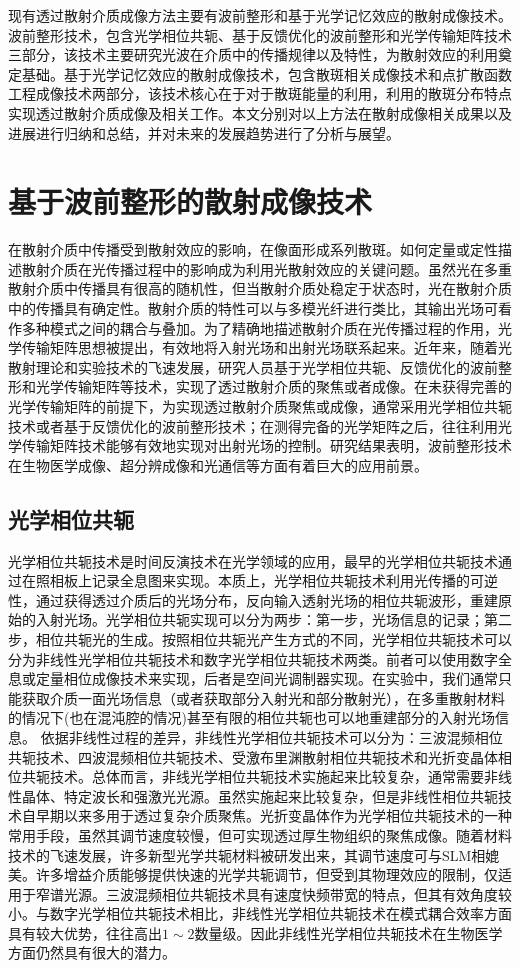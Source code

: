 现有透过散射介质成像方法主要有波前整形和基于光学记忆效应的散射成像技术。波前整形技术，包含光学相位共轭、基于反馈优化的波前整形和光学传输矩阵技术三部分，该技术主要研究光波在介质中的传播规律以及特性，为散射效应的利用奠定基础。基于光学记忆效应的散射成像技术，包含散斑相关成像技术和点扩散函数工程成像技术两部分，该技术核心在于对于散斑能量的利用，利用的散斑分布特点实现透过散射介质成像及相关工作。本文分别对以上方法在散射成像相关成果以及进展进行归纳和总结，并对未来的发展趋势进行了分析与展望。

\section{基于波前整形的散射成像技术}

在散射介质中传播受到散射效应的影响，在像面形成系列散斑。如何定量或定性描述散射介质在光传播过程中的影响成为利用光散射效应的关键问题。虽然光在多重散射介质中传播具有很高的随机性，但当散射介质处稳定于状态时，光在散射介质中的传播具有确定性。散射介质的特性可以与多模光纤进行类比，其输出光场可看作多种模式之间的耦合与叠加。为了精确地描述散射介质在光传播过程的作用，光学传输矩阵思想被提出，有效地将入射光场和出射光场联系起来。近年来，随着光散射理论和实验技术的飞速发展，研究人员基于光学相位共轭、反馈优化的波前整形和光学传输矩阵等技术，实现了透过散射介质的聚焦或者成像。在未获得完善的光学传输矩阵的前提下，为实现透过散射介质聚焦或成像，通常采用光学相位共轭技术或者基于反馈优化的波前整形技术；在测得完备的光学矩阵之后，往往利用光学传输矩阵技术能够有效地实现对出射光场的控制。研究结果表明，波前整形技术在生物医学成像、超分辨成像和光通信等方面有着巨大的应用前景。

\subsection{光学相位共轭}

光学相位共轭技术是时间反演技术在光学领域的应用，最早的光学相位共轭技术通过在照相板上记录全息图来实现。本质上，光学相位共轭技术利用光传播的可逆性，通过获得透过介质后的光场分布，反向输入透射光场的相位共轭波形，重建原始的入射光场。光学相位共轭实现可以分为两步：第一步，光场信息的记录；第二步，相位共轭光的生成。按照相位共轭光产生方式的不同，光学相位共轭技术可以分为非线性光学相位共轭技术和数字光学相位共轭技术两类。前者可以使用数字全息或定量相位成像技术来实现，后者是空间光调制器实现。在实验中，我们通常只能获取介质一面光场信息（或者获取部分入射光和部分散射光），在多重散射材料的情况下(也在混沌腔的情况)甚至有限的相位共轭也可以地重建部分的入射光场信息。
依据非线性过程的差异，非线性光学相位共轭技术可以分为：三波混频相位共轭技术、四波混频相位共轭技术、受激布里渊散射相位共轭技术和光折变晶体相位共轭技术。总体而言，非线光学相位共轭技术实施起来比较复杂，通常需要非线性晶体、特定波长和强激光光源。虽然实施起来比较复杂，但是非线性相位共轭技术自早期以来多用于透过复杂介质聚焦。光折变晶体作为光学相位共轭技术的一种常用手段，虽然其调节速度较慢，但可实现透过厚生物组织的聚焦成像。随着材料技术的飞速发展，许多新型光学共轭材料被研发出来，其调节速度可与SLM相媲美。许多增益介质能够提供快速的光学共轭调节，但受到其物理效应的限制，仅适用于窄谱光源。三波混频相位共轭技术具有速度快频带宽的特点，但其有效角度较小。与数字光学相位共轭技术相比，非线性光学相位共轭技术在模式耦合效率方面具有较大优势，往往高出$1 \sim 2$数量级。因此非线性光学相位共轭技术在生物医学方面仍然具有很大的潜力。

